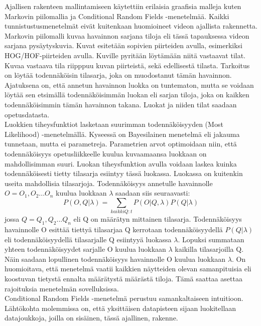 Ajallisen rakenteen mallintamiseen käytettiin erilaisia graafisia malleja kuten Markovin piilomallia ja Conditional Random Fields -menetelmää.
Kaikki tunnistustusmenetelmät eivät kuitenkaan huomioineet videon ajallista rakennetta. \citep {6239178}\\ 

Markovin piilomalli kuvaa havainnon sarjana tiloja eli tässä tapauksessa videon sarjana pysäytyskuvia. 
Kuvat esitetään sopivien piirteiden avulla, esimerkiksi HOG/HOF-piirteiden avulla. Kuville
pyritään löytämään niitä vastaavat tilat. Kuvaa vastaava tila riipppuu kuvan piirteistä, sekä edellisestä tilasta.
Tarkoitus on löytää todennäköisin tilasarja, joka on muodostanut tämän havainnon.
Ajatuksena on, että annetun havainnon luokka on tuntematon, mutta se voidaan löytää sen etsimällä todennäköisimmän luokan
eli sarjan tiloja, joka on kaikken todennäköisimmin tämän havainnon takana. Luokat ja niiden tilat saadaan opetusdatasta.\\

Luokkien tiheysfunktiot lasketaan suurimman todennäköisyyden
(Most Likelihood) -menetelmällä. Kyseessä on Bayesilainen menetelmä eli jakauma tunnetaan, mutta ei parametreja.
Parametrien arvot optimoidaan niin, että todennäköisyys opetusliikkeelle kuulua kuvaamaansa luokkaan on mahdollisimman suuri.
Luokan tiheysfunktion avulla voidaan laskea kuinka todennäköisesti tietty tilasarja esiintyy tässä luokassa.
Luokassa on kuitenkin useita mahdollisia tilasarjoja. Todennäköisyys annetulle havainnolle $O = O_{1}, O_{2}...O_{n}$ kuulua 
luokkaan $\lambda$ saadaan siis seuraavasti:
\begin{equation}
P(O,Q|\lambda) = \sum\limits_{kaikki Q:t}P(O|Q, \lambda)P(Q|\lambda)
\end{equation}
jossa $Q = Q_{1}, Q_{2} ... Q_{n}$ eli Q on määrätyn mittainen tilasarja. Todennäköisyys havainnolle O esittää
tiettyä tilasarjaa Q kerrotaan todennäköisyydellä $P(Q|\lambda)$ eli todennäköisyydellä tilasarjalle Q esiintyyä luokassa $\lambda$. 
Lopuksi summataan yhteen todennäköisyydet sarjalle O kuulua luokkaan $\lambda$ kaikilla tilasarjoilla Q. 
Näin saadaan lopullinen todennäköisyys havainnolle O kuulua luokkaan $\lambda$. On huomioitava, että menetelmä vaatii
kaikkien näytteiden olevan samanpituisia eli koostuvan tietystä ennalta määrätystä määrästä tiloja. Tämä saattaa asettaa
rajoituksia menetelmän sovelluksissa.\citep {18626}\\

Conditional Random Fields -menetelmä perustuu samankaltaiseen intuitioon. Lähtökohta molemmissa on, että yksittäisen 
datapisteen sijaan luokitellaan datajoukkoja, joilla on sisäinen, tässä ajallinen, rakenne. \citep {1315232}\\


